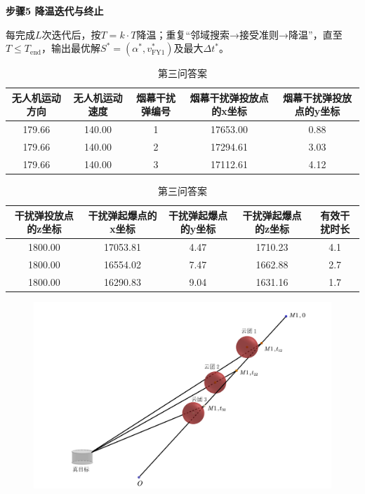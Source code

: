 \documentclass[../main.tex]{subfiles}
\begin{document}
\noindent\textbf{步骤5 降温迭代与终止}

每完成$L$次迭代后，按$T = k \cdot T$降温；重复“邻域搜索→接受准则→降温”，直至$T \leq T_{\text{end}}$，输出最优解$S^*=(\alpha^*, v_{\text{FY1}}^*)$及最大$\Delta t^*$。

\begin{table}[H]
\caption{第三问答案}
\label{tab:001} 
\centering
\begin{small}
\begin{tabular}{ccccc}
\toprule[1.5pt]
无人机运动方向 & 无人机运动速度 & 烟幕干扰弹编号 & 烟幕干扰弹投放点的x坐标& 烟幕干扰弹投放点的y坐标 \\
\midrule[1pt]
  179.66           &140.00                  & 1     & 17653.00                   & 0.88     \\            
  179.66           &140.00                  & 2     & 17294.61                   & 3.03      \\           
  179.66          &140.00                  & 3     & 17112.61                   & 4.12      \\           
\bottomrule[1.5pt]
\end{tabular}
\end{small}
\end{table}


\begin{table}[H]
\caption{第三问答案}
\label{tab:031} 
\centering
\begin{small}
\begin{tabular}{ccccc}
\toprule[1.5pt]
    干扰弹投放点的z坐标 &干扰弹起爆点的x坐标&干扰弹起爆点的y坐标&干扰弹起爆点的z坐标&有效干扰时长\\
\midrule[1pt]
1800.00             &17053.81                   & 4.47    &1710.23        & 4.1  \\               
1800.00             &16554.02                   & 7.47    & 1662.88       & 2.7  \\               
1800.00             &16290.83                   & 9.04    & 1631.16       & 1.7  \\                
\bottomrule[1.5pt]
\end{tabular}
\end{small}
\end{table}

\begin{figure}[H]
\centering
\includegraphics[scale=0.5]{图二.png}
\caption{}
\label{图2}
\end{figure}
\end{document}
